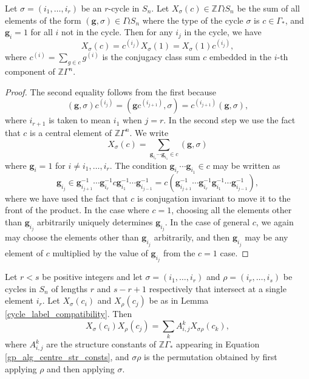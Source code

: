 \documentclass[ALCO,Unicode]{cedram}
\begin{document}
\begin{lemma} \label{cycle_label_compatibility}
Let $\sigma = (i_1, \ldots, i_r)$ be an $r$-cycle in $S_n$. Let $X_\sigma(c) \in \mathbb{Z}\Gamma \wr S_n$ be the sum of all elements of the form $(\mathbf{g}, \sigma) \in \Gamma \wr S_n$ where the type of the cycle $\sigma$ is $c \in \Gamma_*$, and $\mathbf{g}_i = 1$ for all $i$ not in the cycle. Then for any $i_j$ in the cycle, we have
\[
X_\sigma(c) = c^{(i_j)}X_\sigma(1) = X_\sigma(1) c^{(i_j)},
\]
where $c^{(i)} = \sum_{g \in c} g^{(i)}$ is the conjugacy class sum $c$ embedded in the $i$-th component of $\mathbb{Z}\Gamma^n$. 
\end{lemma}
\begin{proof}
The second equality follows from the first because
\[
(\mathbf{g}, \sigma) c^{(i_j)}  = (\mathbf{g}c^{(i_{j+1})}, \sigma) = c^{(i_{j+1})}(\mathbf{g}, \sigma),
\]
where $i_{r+1}$ is taken to mean $i_1$ when $j=r$. In the second step we use the fact that $c$ is a central element of $\mathbb{Z}\Gamma^n$. We write
\[
X_\sigma(c) = \sum_{\mathbf{g}_{i_r} \cdots \mathbf{g}_{i_1} \in c} (\mathbf{g}, \sigma)
\]
where $\mathbf{g}_i = 1$ for $i \neq i_1, \ldots, i_r$. The condition $\mathbf{g}_{i_r} \cdots \mathbf{g}_{i_1} \in c$ may be written as
\[
\mathbf{g}_{i_j} \in \mathbf{g}_{i_{j+1}}^{-1} \cdots \mathbf{g}_{i_{r}}^{-1}c\mathbf{g}_{i_1}^{-1} \cdots \mathbf{g}_{i_{j-1}}^{-1} = c (\mathbf{g}_{i_{j+1}}^{-1} \cdots \mathbf{g}_{i_{r}}^{-1}\mathbf{g}_{i_1}^{-1} \cdots \mathbf{g}_{i_{j-1}}^{-1}),
\]
where we have used the fact that $c$ is conjugation invariant to move it to the front of the product. In the case where $c=1$, choosing all the elements other than $\mathbf{g}_{i_j}$ arbitrarily uniquely determines $\mathbf{g}_{i_j}$. In the case of general $c$, we again may choose the elements other than $\mathbf{g}_{i_j}$ arbitrarily, and then $\mathbf{g}_{i_j}$ may be any element of $c$ multiplied by the value of $\mathbf{g}_{i_j}$ from the $c=1$ case.
\end{proof}
\begin{lemma} \label{cycle_label_product}
Let $r<s$ be positive integers and let $\sigma = (i_1, \ldots, i_r)$ and $\rho = (i_r, \ldots, i_s)$ be cycles in $S_n$ of lengths $r$ and $s-r+1$ respectively that intersect at a single element $i_r$. Let $X_\sigma(c_i)$ and $X_\rho(c_j)$ be as in Lemma \ref{cycle_label_compatibility}. Then
\[
X_\sigma(c_i) X_\rho(c_j) = \sum_{k} A_{i,j}^k X_{\sigma\rho}(c_k),
\]
where $A_{i,j}^k$ are the structure constants of $\mathbb{Z}\Gamma_*$ appearing in Equation \eqref{gp_alg_centre_str_consts}, and $\sigma \rho$ is the permutation obtained by first applying $\rho$ and then applying $\sigma$.
\end{lemma}
\end{document}
